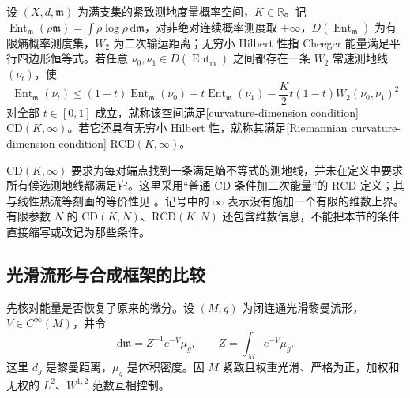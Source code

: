 \begin{definition}\label{g3:def:cd-rcd-infinity}
	设 \((X,d,\mathfrak m)\) 为满支集的紧致测地度量概率空间，\(K\in\mathbb R\)。记 \(\operatorname{Ent}_{\mathfrak m}(\rho\mathfrak m)=\int\rho\log\rho\,\mathrm d\mathfrak m\)，对非绝对连续概率测度取 \(+\infty\)，\(D(\operatorname{Ent}_{\mathfrak m})\) 为有限熵概率测度集，\(W_2\) 为二次输运距离；无穷小 Hilbert 性指 Cheeger 能量满足平行四边形恒等式。若任意 \(\nu_0,\nu_1\in D(\operatorname{Ent}_{\mathfrak m})\) 之间都存在一条 \(W_2\) 常速测地线 \((\nu_t)\)，使
	\begin{equation}\label{g3:eq:cd-infinity-entropy-convexity}
		\operatorname{Ent}_{\mathfrak m}(\nu_t)
		\le(1-t)\operatorname{Ent}_{\mathfrak m}(\nu_0)
		+t\operatorname{Ent}_{\mathfrak m}(\nu_1)
		-\frac K2t(1-t)W_2(\nu_0,\nu_1)^2
	\end{equation}
	对全部 \(t\in[0,1]\) 成立，就称该空间满足[curvature-dimension condition] \(\mathrm{CD}(K,\infty)\)。若它还具有无穷小 Hilbert 性，就称其满足[Riemannian curvature-dimension condition] \(\mathrm{RCD}(K,\infty)\)。
\end{definition}

\(\mathrm{CD}(K,\infty)\) 要求为每对端点找到一条满足熵不等式的测地线，并未在定义中要求所有候选测地线都满足它。这里采用“普通 \(\mathrm{CD}\) 条件加二次能量”的 \(\mathrm{RCD}\) 定义；其与线性热流等刻画的等价性见 \cite[定理6.1，接受稿第30页]{AmbrosioGigliMondinoRajala2015RCD}。记号中的 \(\infty\) 表示没有施加一个有限的维数上界。有限参数 \(N\) 的 \(\mathrm{CD}(K,N)\)、\(\mathrm{RCD}(K,N)\) 还包含维数信息，不能把本节的条件直接缩写或改记为那些条件。

\subsection{光滑流形与合成框架的比较}
\label{g3:subsec:2904:03}
先核对能量是否恢复了原来的微分。设 \((M,g)\) 为闭连通光滑黎曼流形，\(V\in C^\infty(M)\)，并令
\begin{equation}\label{g3:eq:weighted-manifold-probability}
	\mathrm d\mathfrak m=Z^{-1}e^{-V}\mu_g,
	\qquad Z=\int_Me^{-V}\mu_g.
\end{equation}
这里 \(d_g\) 是黎曼距离，\(\mu_g\) 是体积密度。因 \(M\) 紧致且权重光滑、严格为正，加权和无权的 \(L^2\)、\(W^{1,2}\) 范数互相控制。

